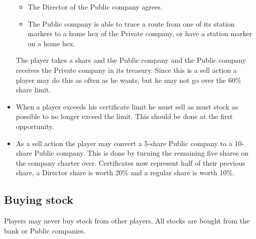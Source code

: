 \documentclass[a4paper,twocolumn]{article}
\begin{document}
\begin{itemize}
\begin{itemize}
		\item The Director of the Public company agrees.
		\item The Public company is able to trace a route from one of its
		station markers to a home hex of the Private company, or have a station
		marker on a home hex.
	\end{itemize}
	The player takes a share and the Public company and the Public company
	receives the Private company in its treasury. Since this is a sell action a
	player may do this as often as he wants, but he may not go over the 60\%
	share limit.
	\item When a player exceeds his certificate limit he must sell as must stock
	as possible to no longer exceed the limit. This should be done at the first
	opportunity.
	\item As a sell action the player may convert a 5-share Public company to a
	10-share Public company. This is done by turning the remaining five shares
	on the company charter over. Certificates now represent half of their
	previous share, a Director share is worth 20\% and a regular share is worth
	10\%.
\end{itemize}

\subsection{Buying stock}\label{sec:buying}
Players may never buy stock from other players. All stocks are bought
from the bank or Public companies.
\end{document}
